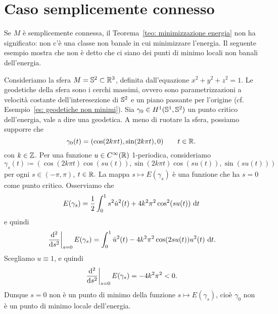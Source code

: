 \section{Caso semplicemente connesso}\label{sez: semplicemente connesso}

Se \(M\) è semplicemente connessa, il Teorema~\ref{teo: minimizzazione energia} non ha significato: non c'è una classe non banale in cui minimizzare l'energia. Il seguente esempio mostra che non è detto che ci siano dei punti di minimo locali non banali dell'energia.
\begin{es}
	Consideriamo la sfera \(M=\mathbb{S}^2 \subset \mathbb{R}^3\), definita dall'equazione \(x^2+y^2+z^2=1\). Le geodetiche della sfera sono i cerchi massimi, ovvero sono parametrizzazioni a velocità costante dell'interesezione di \(\mathbb{S}^2\) e un piano passante per l'origine (cf. Esempio~\ref{es: geodetiche non minimi}).
	Sia \(\gamma_0 \in H^1(\mathbb{S}^1,\mathbb{S}^2)\) un punto critico dell'energia, vale a dire una geodetica. A meno di ruotare la sfera, possiamo supporre che 
	\[
		\gamma_0(t) = (\cos(2 k\pi t), \sin(2k \pi t),0) \qquad t \in \mathbb{R}.
	\]
	con \(k \in \mathbb{Z}\). Per una funzione \(u \in C^\infty(\mathbb{R})\) 1-periodica, consideriamo
	\[
		\gamma_s(t) \coloneq (\cos(2k \pi t)\cos(s u(t)), \sin(2k\pi t)\cos(su(t)),\sin(su(t)))
	\]
	per ogni \(s \in (-\pi,\pi)\), \(t \in \mathbb{R}.\)
	La mappa \(s \mapsto E(\gamma_s)\) è una funzione che ha \(s=0\) come punto critico. Osserviamo che
	\[
		E(\gamma_s) = \frac{1}{2} \int_0^1s^2 \dot u^2(t) + 4k^2\pi^2\cos^2(su(t))\ \mathrm{d} t 
	\]
	e quindi
	\[
		\left.\frac{\mathrm{d}^2}{\mathrm{d} s^2}\right|_{s=0} E(\gamma_s) = \int_0^1 \dot u^2(t) - 4k^2\pi^2\cos(2su(t))u^2(t) \ \mathrm{d} t.
	\]
	Scegliamo \(u\equiv 1\), e quindi 
	\[
			\left.\frac{\mathrm{d}^2}{\mathrm{d} s^2}\right|_{s=0} E(\gamma_s) = -4k^2\pi^2 <0.
	\]
	Dunque \(s=0\) non è un punto di minimo della funzione \(s \mapsto E(\gamma_s)\), cioè \(\gamma_0\) non è un punto di minimo locale dell'energia.
	
	
\end{es}


